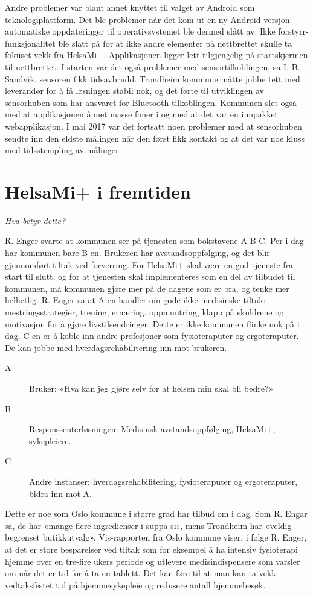 Andre problemer var blant annet knyttet til valget av Android som teknologiplattform. Det ble problemer når det kom ut en ny Android-versjon --
automatiske oppdateringer til operativsystemet ble dermed slått av. Ikke forstyrr-funksjonalitet ble slått på for at ikke andre elementer
på nettbrettet skulle ta fokuset vekk fra HelsaMi+. Applikasjonen ligger lett tilgjengelig på startskjermen til nettbrettet. I starten var det også
problemer med sensortilkoblingen, sa I. B. Sandvik, sensoren fikk tidsavbrudd. Trondheim kommune måtte jobbe tett med leverandør
for å få løsningen stabil nok, og det førte
til utviklingen av sensorhuben som har ansvaret for Bluetooth-tilkoblingen.
Kommunen slet også med at applikasjonen åpnet masse faner i og med at
det var en innpakket webapplikasjon. I mai 2017 var det fortsatt noen problemer med at sensorhuben
sendte inn den eldste målingen når den først fikk kontakt og at det var noe kluss med tidsstempling av målinger.

\section{HelsaMi+ i fremtiden}
\textit{ Hva betyr dette?}

R. Enger svarte at kommunen ser på tjenesten som bokstavene A-B-C. Per i dag har kommunen bare B-en. Brukeren har avstandsoppfølging, og det blir
gjennomført tiltak ved forverring. For HelsaMi+ skal være en god tjeneste fra start til slutt, og for at tjenesten skal
implementeres som en del av tilbudet til kommunen, må kommunen gjøre mer på de dagene som er bra,
og tenke mer helhetlig. R. Enger sa at A-en handler om gode ikke-medisinske tiltak: mestringsstrategier, trening, ernæring,
oppmuntring, klapp på skuldrene og motivasjon for å gjøre livstilsendringer. Dette er ikke kommunen flinke nok på i dag. C-en er å koble
inn andre profesjoner som fysioteraputer og ergoteraputer. De kan jobbe med hverdagsrehabilitering inn mot brukeren.

\begin{description}
\item[A] Bruker: «Hva kan jeg gjøre selv for at helsen min skal bli bedre?»
\item[B] Responssenterløsningen: Medisinsk avstandsoppfølging, HelsaMi+, sykepleiere.
\item[C] Andre instanser: hverdagsrehabilitering, fysioteraputer og ergoteraputer, bidra inn mot A.
\end{description}

Dette er noe som Oslo kommune i større grad har tilbud om i dag. Som R. Engar sa, de har «mange flere ingredienser i suppa si», mens Trondheim
har «veldig begrenset butikkutvalg». Vis-rapporten fra Oslo kommune viser, i følge R. Enger, at det er store besparelser ved tiltak som
for eksempel å ha intensiv fysioterapi hjemme over en tre-fire ukers periode og utlevere  medisindispensere som varsler om når det er tid for
å ta en tablett. Det kan føre til at man kan ta vekk vedtaksfestet tid på hjemmesykepleie og redusere antall hjemmebesøk.
